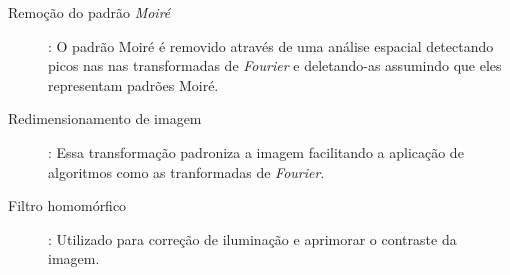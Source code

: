 \begin{description}
    \item[Remoção do padrão \textit{Moiré}]: O padrão Moiré é removido através de uma análise espacial detectando picos nas nas transformadas de \textit{Fourier} e deletando-as assumindo que eles representam padrões Moiré.
    
    \item[Redimensionamento de imagem]: Essa transformação padroniza a imagem facilitando a aplicação de algoritmos como as tranformadas de \textit{Fourier}.
    
    \item[Filtro homomórfico]: Utilizado para correção de iluminação e aprimorar o contraste da imagem.
\end{description}
    







